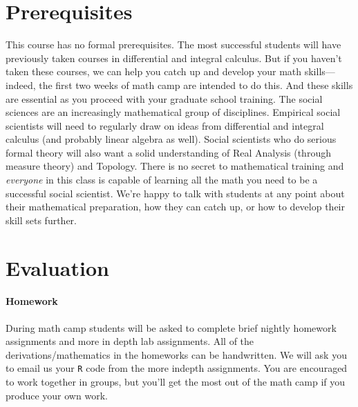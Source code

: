 \documentclass[11pt,letterpaper]{article}
\numberwithin{equation}{section}
\begin{document}
\section*{Prerequisites}
This course has no formal prerequisites. The most successful students will have previously taken courses in differential and integral calculus.  But if you haven't taken these courses, we can help you catch up and develop your math skills---indeed, the first two weeks of math camp are intended to do this.  And these skills are essential as you proceed with your graduate school training.  The social sciences are an increasingly mathematical group of disciplines. Empirical social scientists will need to regularly draw on ideas from differential and integral calculus (and probably linear algebra as well).  Social scientists who do serious formal theory will also want a solid understanding of Real Analysis (through measure theory) and Topology.  There is no secret to mathematical training and \emph{everyone} in this class is capable of learning all the math you need to be a successful social scientist.  We're happy to talk with students at any point about their mathematical preparation, how they can catch up, or how to develop their skill sets further.

\section*{Evaluation}


\paragraph{Homework} During math camp students will be asked to complete brief nightly homework assignments and more in depth lab assignments.  All of the derivations/mathematics in the homeworks can be handwritten.  We will ask you to email us your {\tt R} code from the more indepth assignments.  You are encouraged to work together in groups, but you'll get the most out of the math camp if you produce your own work.     %

\end{document}

